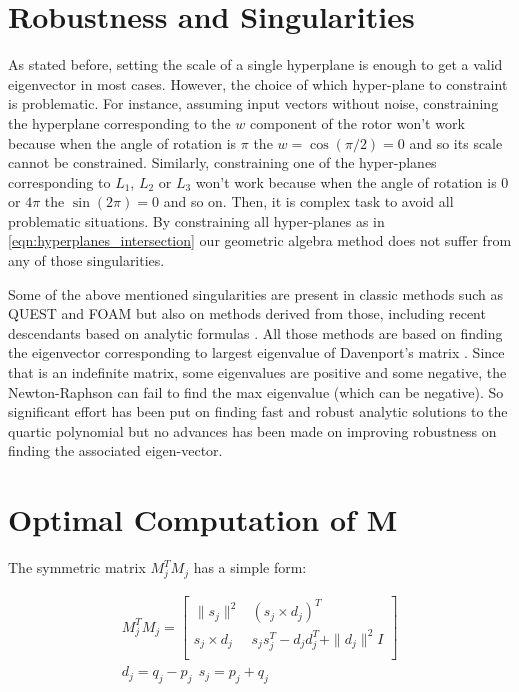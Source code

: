 \documentclass{birkjour}
\numberwithin{equation}{section}
\begin{document}
\section{Robustness and Singularities}
\label{section:robustness}

As stated before, setting the scale of a single hyperplane is enough to get a valid eigenvector in most cases. However, the choice of which hyper-plane to constraint is problematic. For instance,  assuming input vectors without noise, constraining the hyperplane corresponding to the $w$ component of the rotor won't work because when the angle of rotation is $\pi$ the $w = \cos(\pi/2) = 0$ and so its scale cannot be constrained. Similarly, constraining one of the hyper-planes corresponding to $L_1$, $L_2$ or $L_3$ won't work because when the angle of rotation is $0$ or $4 \pi$ the $\sin(2 \pi) = 0$ and so on. Then, it is complex task to avoid all problematic situations. By constraining all hyper-planes as in \ref{eqn:hyperplanes_intersection} our geometric algebra method does not suffer from any of those singularities.

Some of the above mentioned singularities are present in classic methods such as QUEST \cite{Shuster1981} and FOAM \cite{Markley1993} but also on methods derived from those, including recent descendants based on analytic formulas \cite{Yang2013, Wu2016, Wu2017, Wu2018FA3R, Wu2018FS3R}. All those methods are based on finding the eigenvector corresponding to largest eigenvalue of Davenport's matrix \cite{Davenport1968}. Since that is an indefinite matrix, some eigenvalues are positive and some negative, the Newton-Raphson can fail to find the max eigenvalue (which can be negative). So significant effort has been put on finding fast and robust analytic solutions to the quartic polynomial but no advances has been made on improving robustness on finding the associated eigen-vector.

\section{Optimal Computation of M}

The symmetric matrix $M_j^T M_j$ has a simple form:

\begin{eqnarray*}
	M_j^T M_j = 
	\left[\begin{array}{cc}
		\| s_j \|^2        &         (s_j \times d_j)^T \\
		s_j \times d_j  &    s_j s_j^T - d_j d_j^T + \| d_j \|^2 I \\
	\end{array}\right]\\
	d_j = q_j - p_j \ \ s_j = p_j + q_j
\end{eqnarray*}
\end{document}
